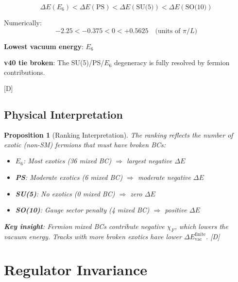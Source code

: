 \documentclass[11pt,a4paper]{article}
\newtheorem{proposition}[theorem]{Proposition}
\newcommand{\tagD}{\textcolor{blue!70!black}{[D]}}
\begin{document}
\begin{resultbox}
\begin{equation}
\label{eq:final-ranking}
\boxed{\Delta E(E_6) < \Delta E(\text{PS}) < \Delta E(\text{SU(5)}) < \Delta E(\text{SO(10)})}
\end{equation}

Numerically:
\begin{equation}
\label{eq:final-ranking-num}
-2.25 < -0.375 < 0 < +0.5625 \quad \text{(units of $\pi/L$)}
\end{equation}

\textbf{Lowest vacuum energy}: $E_6$

\textbf{v40 tie broken}: The SU(5)/PS/$E_6$ degeneracy is fully resolved by fermion contributions.

\tagD
\end{resultbox}

\subsection{Physical Interpretation}

\begin{proposition}[Ranking Interpretation]
\label{prop:interp}
The ranking reflects the number of exotic (non-SM) fermions that must have broken BCs:
\begin{itemize}
    \item \textbf{$E_6$}: Most exotics (36 mixed BC) $\Rightarrow$ largest negative $\Delta E$
    \item \textbf{PS}: Moderate exotics (6 mixed BC) $\Rightarrow$ moderate negative $\Delta E$
    \item \textbf{SU(5)}: No exotics (0 mixed BC) $\Rightarrow$ zero $\Delta E$
    \item \textbf{SO(10)}: Gauge sector penalty (4 mixed BC) $\Rightarrow$ positive $\Delta E$
\end{itemize}

\textbf{Key insight}: Fermion mixed BCs contribute \emph{negative} $\chi_F$, which lowers the vacuum energy.
Tracks with more broken exotics have lower $\Delta E_{\text{vac}}^{\text{finite}}$.
\tagD
\end{proposition}

\section{Regulator Invariance}
\end{document}
